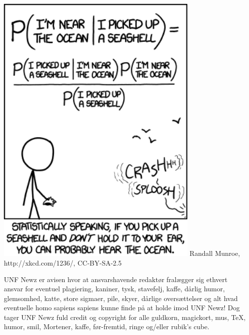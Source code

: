 \begin{minipage}[b]{0.95\linewidth}
\begin{minipage}[t]{0.47\textwidth}
\vspace{3mm}
\includegraphics[width=100mm]{seashell.png}
\tiny Randall Munroe, http://xkcd.com/1236/, CC-BY-SA-2.5
\end{minipage}

\vspace{3mm}

\begin{center}
\tiny UNF Newz er avisen hvor at ansvarshavende redaktør fralægger sig ethvert ansvar for eventuel plagiering, kaniner, tysk, stavefelj, kaffe, dårlig humor, glemsomhed, katte, store sigmaer, pile, skyer, dårlige oversættelser og alt hvad eventuelle homo sapiens sapiens kunne finde på at holde imod UNF Newz! Dog tager UNF Newz fuld credit og copyright for alle guldkorn, magickort, mus, \TeX, humor, smil, Mortener, kaffe, før-fremtid, ringe og/eller rubik's cube.
\end{center}
\end{minipage}

